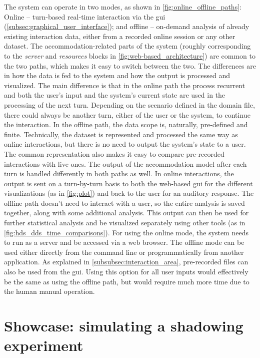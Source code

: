 The system can operate in two modes, as shown in \cref{fig:online_offline_paths}:
Online -- turn-based real-time interaction via the \ac{gui} (\cref{subsec:graphical_user_interface}); and offline -- on-demand analysis of already existing interaction data, either from a recorded online session or any other dataset.
The accommodation-related parts of the system (roughly corresponding to the \emph{server} and \emph{resources} blocks in \cref{fig:web-based_architecture}) are common to the two paths, which makes it easy to switch between the two.
The differences are in how the data is fed to the system and how the output is processed and visualized.
The main difference is that in the online path the process recurrent and both the user's input and the system's current state are used in the processing of the next turn.
Depending on the scenario defined in the domain file, there could always be another turn, either of the user or the system, to continue the interaction.
In the offline path, the data scope is, naturally, pre-defined and finite.
Technically, the dataset is represented and processed the same way as online interactions, but there is no need to output the system's state to a user.
The common representation also makes it easy to compare pre-recorded interactions with live ones.
The output of the accommodation model after each turn is handled differently in both paths as well.
In online interactions, the output is sent on a turn-by-turn basis to both the web-based \ac{gui} for the different visualizations (as in \cref{fig:plot}) and back to the user for an auditory response.
The offline path doesn't need to interact with a user, so the entire analysis is saved together, along with some additional analysis.
This output can then be used for further statistical analysis and be visualized separately using other tools (as in \cref{fig:hds_dds_time_comparisons}).
For using the online mode, the system needs to run as a server and be accessed via a web browser.
The offline mode can be used either directly from the command line or programmatically from another application.
As explained in \cref{subsubsec:interaction_area}, pre-recorded files can also be used from the \ac{gui}.
Using this option for all user inputs would effectively be the same as using the offline path, but would require much more time due to the human manual operation.

\section{Showcase: simulating a shadowing experiment}
\label{sec:showcase}

